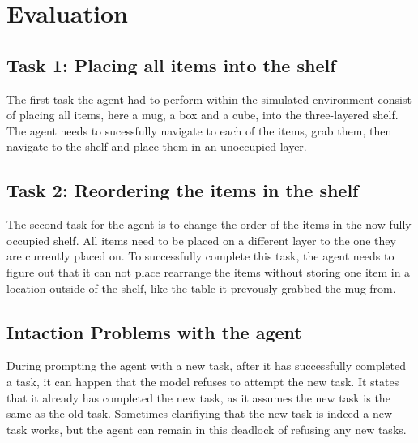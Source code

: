\documentclass[../report.tex]{subfiles}
\begin{document}
\section{Evaluation}
\label{sec:evaluation}

\subsection{Task 1: Placing all items into the shelf}
The first task the agent had to perform within the simulated environment consist of placing all items, here a mug, a box and a cube, into the three-layered shelf. The agent needs to sucessfully navigate to each of the items, grab them, then navigate to the shelf and place them in an unoccupied layer. \\

\subsection{Task 2: Reordering the items in the shelf}
The second task for the agent is to change the order of the items in the now fully occupied shelf. All items need to be placed on a different layer to the one they are currently placed on. To successfully complete this task, the agent needs to figure out that it can not place rearrange the items without storing one item in a location outside of the shelf, like the table it prevously grabbed the mug from. \\




\subsection{Intaction Problems with the agent}
During prompting the agent with a new task, after it has successfully completed a task, it can happen that the model refuses to attempt the new task. It states that it already has completed the new task, as it assumes the new task is the same as the old task. Sometimes clarifiying that the new task is indeed a new task works, but the agent can remain in this deadlock of refusing any new tasks.
\end{document}
